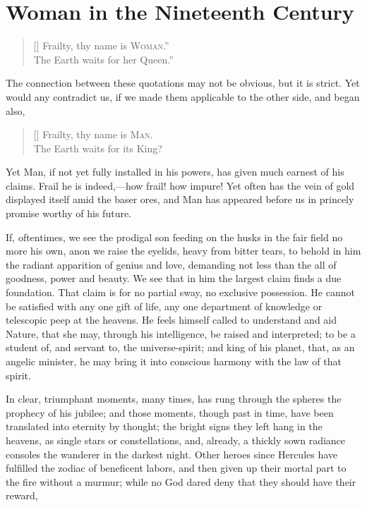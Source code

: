 
\author{Margaret Fuller}
\chapter[Woman in the Nineteenth Century, excerpt]{Woman in the
Nineteenth Century}

\settowidth{}
\begin{verse}[\versewidth]
Frailty, thy name is \textsc{Woman}.''\\
The Earth waits for her Queen.''
\end{verse}

\noindent The connection between these quotations may not be obvious,
but it is strict. Yet would any contradict us, if we made them
applicable to the other side, and began also,

\settowidth{}
\begin{verse}[\versewidth]
Frailty, thy name is \textsc{Man}.\\
The Earth waits for its King?
\end{verse}

\noindent Yet Man, if not yet fully installed in his powers, has given
much earnest of his claims. Frail he is indeed,---how frail! how
impure! Yet often has the vein of gold displayed itself amid the baser
ores, and Man has appeared before us in princely promise worthy of his
future.

If, oftentimes, we see the prodigal son feeding on the husks in the
fair field no more his own, anon we raise the eyelids, heavy from
bitter tears, to behold in him the radiant apparition of genius and
love, demanding not less than the all of goodness, power and beauty.
We see that in him the largest claim finds a due foundation. 
That claim is for no partial sway, no exclusive possession. He cannot
be satisfied with any one gift of life, any one department of
knowledge or telescopic peep at the heavens. He feels himself called
to understand and aid Nature, that she may, through his
intelligence, be raised and interpreted; to be a student of, and
servant to, the universe-spirit; and king of his planet, that, as an
angelic minister, he may bring it into conscious harmony with the law
of that spirit.

In clear, triumphant moments, many times, has rung through the spheres
the prophecy of his jubilee; and those moments, though past in time,
have been translated into eternity by thought; the bright signs they
left hang in the heavens, as single stars or constellations, and,
already, a thickly sown radiance consoles the wanderer in the darkest
night. Other heroes since Hercules have fulfilled the zodiac of
beneficent labors, and then given up their mortal part to the fire
without a murmur; while no God dared deny that they should have their
reward,

